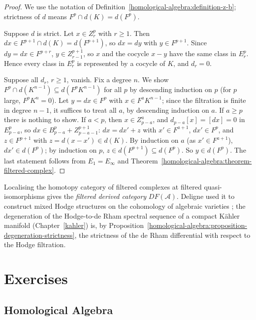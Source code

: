 \begin{proof}
We use the notation of Definition~\ref{homological-algebra:definition-z-b}; strictness of $d$ means $F^p \cap d(K) = d(F^p)$.

Suppose $d$ is strict. Let $x \in Z_r^p$ with $r \geq 1$. Then $dx \in F^{p+1} \cap d(K) = d(F^{p+1})$, so $dx = dy$ with $y \in F^{p+1}$. Since
$dy = dx \in F^{p+r}$, $y \in Z_{r-1}^{p+1}$, so $x$ and the cocycle $x - y$ have the same class in $E_r^p$. Hence every class in $E_r^p$ is represented by
a cocycle of $K$, and $d_r = 0$.

Suppose all $d_r$, $r \geq 1$, vanish. Fix a degree $n$. We show $F^p \cap d(K^{n-1}) \subseteq d(F^pK^{n-1})$ for all $p$ by descending
induction on $p$ (for $p$ large, $F^pK^n = 0$). Let $y = dx \in F^p$ with $x \in F^aK^{n-1}$; since the filtration is finite in degree $n - 1$, it suffices
to treat all $a$, by descending induction on $a$. If $a \geq p$ there is nothing to show. If $a < p$, then
$x \in Z_{p-a}^a$, and $d_{p-a}[x] = [dx] = 0$ in $E_{p-a}^p$, so $dx \in B_{p-a}^p + Z_{p-a-1}^{p+1}$: $dx = dx' + z$ with $x' \in F^{a+1}$, $dx' \in F^p$,
and $z \in F^{p+1}$ with $z = d(x - x') \in d(K)$. By induction on $a$ (as $x' \in F^{a+1}$), $dx' \in d(F^p)$; by induction on $p$, $z \in d(F^{p+1}) \subseteq d(F^p)$. So
$y \in d(F^p)$. The last statement follows from $E_1 = E_\infty$ and Theorem~\ref{homological-algebra:theorem-filtered-complex}.
\end{proof}

\begin{remark}\label{homological-algebra:remark-filtered-derived}
Localising the homotopy category of filtered complexes at filtered quasi-isomorphisms gives the \emph{filtered derived category} $DF(\mathcal{A})$.
Deligne used it to construct mixed Hodge structures on the cohomology of algebraic varieties \cite{deligne-hodge-2}; the degeneration of the
Hodge-to-de Rham spectral sequence of a compact K\"ahler manifold (Chapter~\ref{kahler}) is, by
Proposition~\ref{homological-algebra:proposition-degeneration-strictness}, the strictness of the de Rham differential with respect to the
Hodge filtration.
\end{remark}

\section{Exercises}\label{homological-algebra:section-exercises}

\subsection{Homological Algebra}\label{homological-algebra:subsection-exercises-homological-algebra}

